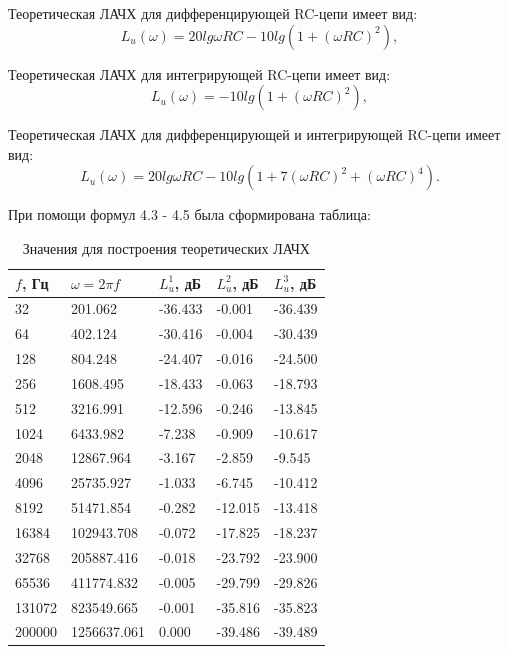 Теоретическая ЛАЧХ для дифференцирующей RC-цепи имеет вид:
\begin{equation}
L_u(\omega) = 20lg \omega RC - 10lg(1+(\omega RC)^2),
\end{equation}

Теоретическая ЛАЧХ для интегрирующей RC-цепи имеет вид:
\begin{equation}
L_u(\omega) = -10lg(1+(\omega RC)^2),
\end{equation}

Теоретическая ЛАЧХ для дифференцирующей и интегрирующей RC-цепи имеет вид:
\begin{equation}
L_u(\omega) = 20lg \omega RC - 10lg(1+7(\omega RC)^2 + (\omega RC)^4).
\end{equation}

При помощи формул 4.3 - 4.5 была сформирована таблица:
\begin{table}[H]
	\begin{center}
	\caption{Значения для построения теоретических ЛАЧХ}
	\def\arraystretch{1.5}
		\begin{tabularx}{\textwidth}{|X|X|X|X|X|}
			\hline
			$f$, Гц & $\omega = 2 \pi f$ & $L_u^1$, дБ & $L_u^2$, дБ & $L_u^3$, дБ\\\hline	
			32 & 201.062 & -36.433 & -0.001 & -36.439\\\hline
			64 & 402.124 & -30.416 & -0.004 & -30.439\\\hline
			128 & 804.248 & -24.407 & -0.016 & -24.500\\\hline
			256 & 1608.495 & -18.433 & -0.063 & -18.793\\\hline
			512 & 3216.991 & -12.596 & -0.246 & -13.845\\\hline
			1024 & 6433.982 & -7.238 & -0.909 & -10.617\\\hline
			2048 & 12867.964 & -3.167 & -2.859 & -9.545\\\hline
			4096 & 25735.927 & -1.033 & -6.745 & -10.412\\\hline
			8192 & 51471.854 & -0.282 & -12.015 & -13.418\\\hline
			16384 & 102943.708 & -0.072 & -17.825 & -18.237\\\hline
			32768 & 205887.416 & -0.018 & -23.792 & -23.900\\\hline
			65536 & 411774.832 & -0.005 & -29.799 & -29.826\\\hline
			131072 & 823549.665 & -0.001 & -35.816 & -35.823\\\hline
			200000 & 1256637.061 & 0.000 & -39.486 & -39.489\\\hline

		\end{tabularx}
		\label{tabular:0}
	\end{center}
\end{table}

